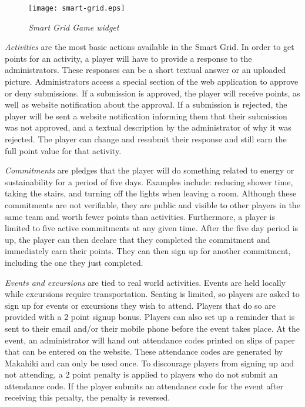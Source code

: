 \begin{figure}[th]
  \center
  \texttt{[image: smart-grid.eps]}
  \caption{\em Smart Grid Game widget}
  \label{fig:SmartGrid}
\end{figure}

{\em Activities} are the most basic actions available in the Smart Grid. In order to get points for an activity, a player will have to provide a response to the administrators. These responses can be a short textual answer or an uploaded picture. Administrators access a special section of the web application to approve or deny submissions. If a submission is approved, the player will receive points, as well as website notification about the approval. If a submission is rejected, the player will be sent a website notification informing them that their submission was not approved, and a textual description by the administrator of why it was rejected. The player can change and resubmit their response and still earn the full point value for that activity.


{\em Commitments} are pledges that the player will do something related to energy or sustainability for a period of five days. Examples include: reducing shower time, taking the stairs, and turning off the lights when leaving a room. Although these commitments are not verifiable, they are public and visible to other players in the same team and worth fewer points than activities. Furthermore, a player is limited to five active commitments at any given time. After the five day period is up, the player can then declare that they completed the commitment and immediately earn their points. They can then sign up for another commitment, including the one they just completed.

{\em Events and excursions} are tied to real world activities. Events are held locally while excursions require transportation. Seating is limited, so players are asked to sign up for events or excursions they wish to attend. Players that do so are provided with a 2 point signup bonus. Players can also set up a reminder that is sent to their email and/or their mobile phone before the event takes place. At the event, an administrator will hand out attendance codes printed on slips of paper that can be entered on the website. These attendance codes are generated by Makahiki and can only be used once. To discourage players from signing up and not attending, a 2 point penalty is applied to players who do not submit an attendance code. If the player submits an attendance code for the event after receiving this penalty, the penalty is reversed.

